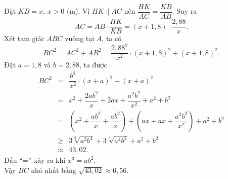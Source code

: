 \begin{ex}
{		Đặt $KB=x$, $x>0$ (m). Vì $HK \parallel AC$ nên $\dfrac{HK}{AC}=\dfrac{KB}{AB}$. Suy ra
		$$AC = AB \cdot \dfrac{HK}{KB} = (x+1{,}8) \cdot \dfrac{2{,}88}{x}.$$
		Xét tam giác $ABC$ vuông tại $A$, ta có
		$$BC^2= AC^2 + AB^2=\dfrac{2{,}88^2}{x^2}\cdot(x+1{,}8)^2 + (x+1{,}8)^2.$$
		Đặt $a=1{,}8$ và $b=2{,}88$, ta được
		\begin{eqnarray*}
			BC^2	&=& \dfrac{b^2}{x^2}\cdot(x+a)^2 + (x+a)^2\\
			&=& x^2 + \dfrac{2ab^2}{x} + 2ax + \dfrac{a^2b^2}{x^2} + a^2 + b^2\\
			&=& \left(x^2 + \dfrac{ab^2}{x} + \dfrac{ab^2}{x}\right) + \left(ax + ax + \dfrac{a^2b^2}{x^2}\right)+a^2+b^2\\
			&\ge& 3\sqrt[3]{a^2b^4}	+ 3\sqrt[3]{a^4b^2}	+a^2+b^2\\
			&\approx& 43{,}02.
		\end{eqnarray*}
		Dấu ``='' xảy ra khi $x^3=ab^2$.\\
		Vậy $BC$ nhỏ nhất bằng $\sqrt{43{,}02}\approx6{,}56$.}
\end{ex}
